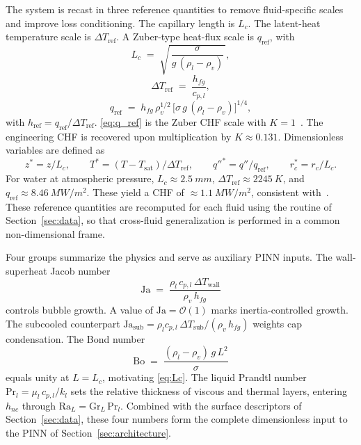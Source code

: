 The system is recast in three reference quantities to remove
fluid-specific scales and improve loss conditioning. The capillary
length is $L_c$. The latent-heat temperature scale is
$\Delta T_{\mathrm{ref}}$. A Zuber-type heat-flux scale is
$q_{\mathrm{ref}}$, with
%
\begin{equation}\label{eq:Lc}
L_c \;=\; \sqrt{\,\frac{\sigma}{g\,(\rho_l - \rho_v)}\,},
\end{equation}
%
\begin{equation}\label{eq:dT_ref}
\Delta T_{\mathrm{ref}} \;=\; \frac{h_{fg}}{c_{p,l}},
\end{equation}
%
\begin{equation}\label{eq:q_ref}
q_{\mathrm{ref}} \;=\; h_{fg}\,\rho_v^{1/2}\,\bigl[\sigma\,g\,(\rho_l - \rho_v)\bigr]^{1/4},
\end{equation}
%
with $h_{\mathrm{ref}} = q_{\mathrm{ref}}/\Delta T_{\mathrm{ref}}$.
\cref{eq:q_ref} is the Zuber CHF scale with $K=1$~\citep{lienhard1981}.
The engineering CHF is recovered upon multiplication by $K \approx 0.131$.
Dimensionless variables are defined as
%
\begin{equation*}
z^{\ast} = z/L_c, \qquad
T^{\ast} = (T-T_{\mathrm{sat}})/\Delta T_{\mathrm{ref}}, \qquad
q''^{\ast} = q''/q_{\mathrm{ref}}, \qquad
r_c^{\ast} = r_c/L_c.
\end{equation*}
%
For water at atmospheric pressure, $L_c \approx \SI{2.5}{mm}$,
$\Delta T_{\mathrm{ref}} \approx \SI{2245}{K}$, and
$q_{\mathrm{ref}} \approx \SI{8.46}{MW/m^2}$. These yield a CHF of
$\approx \SI{1.1}{MW/m^2}$, consistent
with~\citet{zuber1959,lienhard1981}. These reference quantities are
recomputed for each fluid using the routine of Section~\ref{sec:data}, so
that cross-fluid generalization is performed in a common non-dimensional
frame.

Four groups summarize the physics and serve as auxiliary PINN inputs. The
wall-superheat Jacob number
%
\begin{equation}\label{eq:ja_sup}
\mathrm{Ja} \;=\;
\frac{\rho_l\,c_{p,l}\,\Delta T_{\mathrm{wall}}}{\rho_v\,h_{fg}}
\end{equation}
%
controls bubble growth. A value of $\mathrm{Ja}=\mathcal{O}(1)$ marks
inertia-controlled growth. The subcooled counterpart
$\mathrm{Ja}_{\mathrm{sub}} = \rho_l c_{p,l}\,\Delta T_{\mathrm{sub}}/(\rho_v\,h_{fg})$
weights cap condensation. The Bond number
%
\begin{equation}\label{eq:bond}
\mathrm{Bo} \;=\;
\frac{(\rho_l - \rho_v)\,g\,L^{2}}{\sigma}
\end{equation}
%
equals unity at $L=L_c$, motivating \cref{eq:Lc}. The liquid Prandtl
number $\mathrm{Pr}_l = \mu_l\,c_{p,l}/k_l$ sets the relative thickness
of viscous and thermal layers, entering $h_{nc}$ through
$\mathrm{Ra}_L = \mathrm{Gr}_L\,\mathrm{Pr}_l$. Combined with the surface
descriptors of Section~\ref{sec:data}, these four numbers form the
complete dimensionless input to the PINN of
Section~\ref{sec:architecture}.
